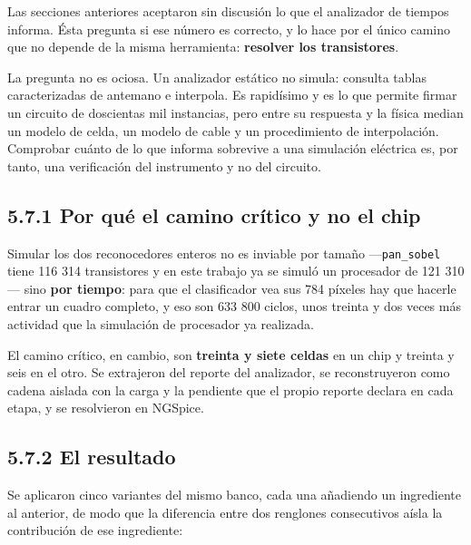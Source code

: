 Las secciones anteriores aceptaron sin discusión lo que el analizador de
tiempos informa. Ésta pregunta si ese número es correcto, y lo hace por
el único camino que no depende de la misma herramienta: \textbf{resolver
los transistores}.

La pregunta no es ociosa. Un analizador estático no simula: consulta
tablas caracterizadas de antemano e interpola. Es rapidísimo y es lo que
permite firmar un circuito de doscientas mil instancias, pero entre su
respuesta y la física median un modelo de celda, un modelo de cable y un
procedimiento de interpolación. Comprobar cuánto de lo que informa
sobrevive a una simulación eléctrica es, por tanto, una verificación del
instrumento y no del circuito.

\subsection{5.7.1 Por qué el camino crítico y no el
chip}\label{por-quuxe9-el-camino-cruxedtico-y-no-el-chip}

Simular los dos reconocedores enteros no es inviable por tamaño
---\texttt{pan\_sobel} tiene 116 314 transistores y en este trabajo ya
se simuló un procesador de 121 310--- sino \textbf{por tiempo}: para que
el clasificador vea sus 784 píxeles hay que hacerle entrar un cuadro
completo, y eso son 633 800 ciclos, unos treinta y dos veces más
actividad que la simulación de procesador ya realizada.

El camino crítico, en cambio, son \textbf{treinta y siete celdas} en un
chip y treinta y seis en el otro. Se extrajeron del reporte del
analizador, se reconstruyeron como cadena aislada con la carga y la
pendiente que el propio reporte declara en cada etapa, y se resolvieron
en NGSpice.

\subsection{5.7.2 El resultado}\label{el-resultado}

Se aplicaron cinco variantes del mismo banco, cada una añadiendo un
ingrediente al anterior, de modo que la diferencia entre dos renglones
consecutivos aísla la contribución de ese ingrediente:

